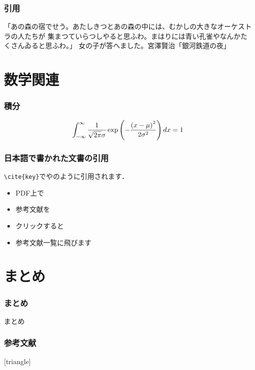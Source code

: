 \documentclass[11pt]{beamer}
\let\oldcite=\citet
\renewcommand\citet[1]{\hyperlink{#1}{\oldcite{#1}}}
\begin{document}
\begin{frame}
    \frametitle{引用}
    \begin{leftbar}
        「あの森の宿でせう。あたしきつとあの森の中には、むかしの大きなオーケストラの人たちが
        集まつていらつしやると思ふわ。まはりには青い孔雀やなんかたくさんゐると思ふわ。」
        女の子が答へました。\hfill 宮澤賢治「銀河鉄道の夜」
    \end{leftbar}
\end{frame}

\section{数学関連}
\begin{frame}
\frametitle{積分}
\begin{align}
    \int_{-\infty}^\infty \frac{1}{\sqrt{2\pi}\sigma}\exp\left(-\frac{\left(x - \mu\right)^2}{2\sigma^2}\right) dx = 1
\end{align}
\end{frame}

\begin{frame}
\frametitle{日本語で書かれた文書の引用}
\texttt{{\textbackslash}cite\{key\}}で\citet{demo}や\citet{japanese}のように引用されます．
    \begin{itemize}
        \item PDF上で
        \item 参考文献を
        \item クリックすると
        \item 参考文献一覧に飛びます
    \end{itemize}
\end{frame}

\section{まとめ}
\begin{frame}
\frametitle{まとめ}
まとめ
\end{frame}

\begin{frame}[allowframebreaks]
\frametitle{参考文献}
\begingroup
\scriptsize
    [triangle]
    
    
\endgroup
\end{frame}
\end{document}
